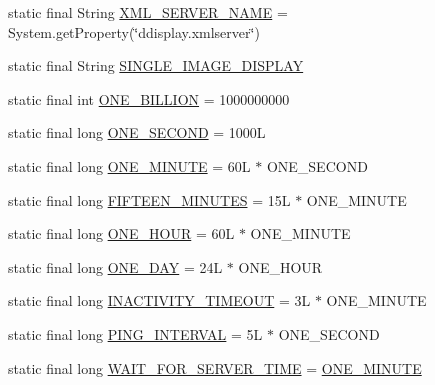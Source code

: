 \begin{DoxyCompactItemize}
\item 
static final String \hyperlink{classgov_1_1fnal_1_1ppd_1_1dd_1_1GlobalVariables_a1b1eb1c9096380d09b968cd474e8bb86}{X\-M\-L\-\_\-\-S\-E\-R\-V\-E\-R\-\_\-\-N\-A\-M\-E} = System.\-get\-Property(\char`\"{}ddisplay.\-xmlserver\char`\"{})
\item 
static final String \hyperlink{classgov_1_1fnal_1_1ppd_1_1dd_1_1GlobalVariables_ab018dd06fadda0d1bc99e7de66894e84}{S\-I\-N\-G\-L\-E\-\_\-\-I\-M\-A\-G\-E\-\_\-\-D\-I\-S\-P\-L\-A\-Y}
\item 
static final int \hyperlink{classgov_1_1fnal_1_1ppd_1_1dd_1_1GlobalVariables_a271c983add4bac415412025c8ac2f4cc}{O\-N\-E\-\_\-\-B\-I\-L\-L\-I\-O\-N} = 1000000000
\item 
static final long \hyperlink{classgov_1_1fnal_1_1ppd_1_1dd_1_1GlobalVariables_a3718d8133f257fcc337f5131c8e22d48}{O\-N\-E\-\_\-\-S\-E\-C\-O\-N\-D} = 1000\-L
\item 
static final long \hyperlink{classgov_1_1fnal_1_1ppd_1_1dd_1_1GlobalVariables_a79fc1e35198b44168537a85aa4c2d942}{O\-N\-E\-\_\-\-M\-I\-N\-U\-T\-E} = 60\-L $\ast$ O\-N\-E\-\_\-\-S\-E\-C\-O\-N\-D
\item 
static final long \hyperlink{classgov_1_1fnal_1_1ppd_1_1dd_1_1GlobalVariables_ae09d2d42603daf3b4d5fccd1c489a93b}{F\-I\-F\-T\-E\-E\-N\-\_\-\-M\-I\-N\-U\-T\-E\-S} = 15\-L $\ast$ O\-N\-E\-\_\-\-M\-I\-N\-U\-T\-E
\item 
static final long \hyperlink{classgov_1_1fnal_1_1ppd_1_1dd_1_1GlobalVariables_a947f75994e24bb52604adf3699920579}{O\-N\-E\-\_\-\-H\-O\-U\-R} = 60\-L $\ast$ O\-N\-E\-\_\-\-M\-I\-N\-U\-T\-E
\item 
static final long \hyperlink{classgov_1_1fnal_1_1ppd_1_1dd_1_1GlobalVariables_aef5cbdf53c9830ae609987b805a08998}{O\-N\-E\-\_\-\-D\-A\-Y} = 24\-L $\ast$ O\-N\-E\-\_\-\-H\-O\-U\-R
\item 
static final long \hyperlink{classgov_1_1fnal_1_1ppd_1_1dd_1_1GlobalVariables_ab33d116e6a83d46d778ee5c3521a39a4}{I\-N\-A\-C\-T\-I\-V\-I\-T\-Y\-\_\-\-T\-I\-M\-E\-O\-U\-T} = 3\-L $\ast$ O\-N\-E\-\_\-\-M\-I\-N\-U\-T\-E
\item 
static final long \hyperlink{classgov_1_1fnal_1_1ppd_1_1dd_1_1GlobalVariables_ac2e535e1d551e5eae9749ad1ff4eeccf}{P\-I\-N\-G\-\_\-\-I\-N\-T\-E\-R\-V\-A\-L} = 5\-L $\ast$ O\-N\-E\-\_\-\-S\-E\-C\-O\-N\-D
\item 
static final long \hyperlink{classgov_1_1fnal_1_1ppd_1_1dd_1_1GlobalVariables_a7ffc604df353f97f39c5c9734c45fb38}{W\-A\-I\-T\-\_\-\-F\-O\-R\-\_\-\-S\-E\-R\-V\-E\-R\-\_\-\-T\-I\-M\-E} = \hyperlink{classgov_1_1fnal_1_1ppd_1_1dd_1_1GlobalVariables_a79fc1e35198b44168537a85aa4c2d942}{O\-N\-E\-\_\-\-M\-I\-N\-U\-T\-E}

\end{DoxyCompactItemize}
